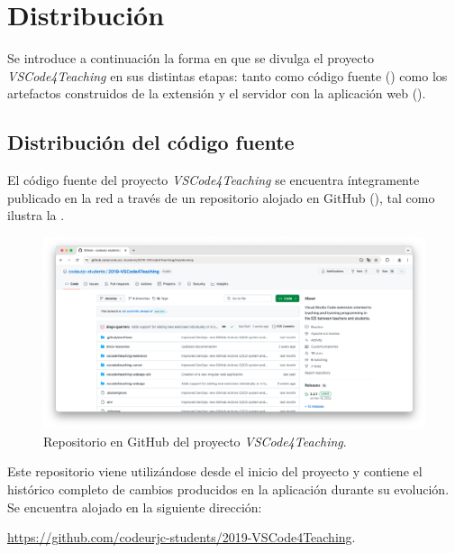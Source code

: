\section{Distribución}
\label{sec:distribucion}
Se introduce a continuación la forma en que se divulga el proyecto \textit{VSCode4Teaching} en sus distintas etapas: tanto como código fuente () como los artefactos construidos de la extensión y el servidor con la aplicación web ().

\subsection{Distribución del código fuente}
\label{subsec:distribFuente}
El código fuente del proyecto \textit{VSCode4Teaching} se encuentra íntegramente publicado en la red a través de un repositorio alojado en GitHub (), tal como ilustra la .

\begin{figure}[ht]
    \centering
    \includegraphics[width=0.8\linewidth]{imagenes/utilizadas/4-5-distribucion/repoGitHub.png}
    \caption{Repositorio en GitHub del proyecto \textit{VSCode4Teaching}.}
    \label{fig:distribGitHub}
\end{figure}

Este repositorio viene utilizándose desde el inicio del proyecto y contiene el histórico completo de cambios producidos en la aplicación durante su evolución. Se encuentra alojado en la siguiente dirección:

\vspace{-0.7\baselineskip}
\begin{center}
    \href{https://github.com/codeurjc-students/2019-VSCode4Teaching}{https://github.com/codeurjc-students/2019-VSCode4Teaching}.
\end{center}
\vspace{-0.7\baselineskip}


